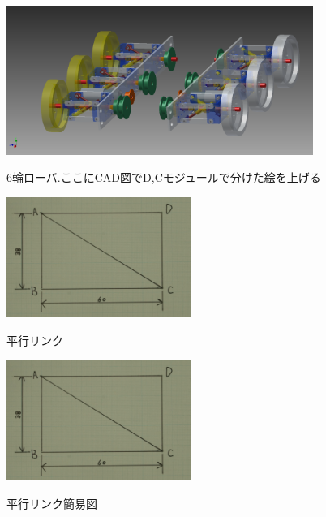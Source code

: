 \documentclass[11pt]{jsarticle}
\begin{document}
\begin{figure}[htbt]
 \begin{center}
  \includegraphics[width=100mm]{img/int.png}
 　\caption{6輪ローバ.ここにCAD図でD,Cモジュールで分けた絵を上げる}
  \label{fig:rokurin}%
 \end{center}
\end{figure}

\begin{figure}[htbt]
 \begin{center}
  \includegraphics[width=60mm]{img/kanizu.jpg}
 　\caption{平行リンク}
  \label{fig:box}%
 \end{center}
\end{figure}



\begin{figure}[htbt]
 \begin{center}
  \includegraphics[width=60mm]{img/kanizu.jpg}
 　\caption{平行リンク簡易図}
  \label{fig:bix}%
 \end{center}
\end{figure}
\end{document}
